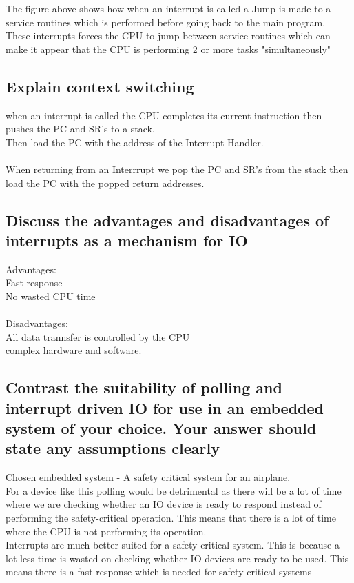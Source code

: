 \documentclass{article}
\begin{document}
The figure above shows how when an interrupt is called a Jump is made to a service routines which is performed before going back to the main program.\\
These interrupts forces the CPU to jump between service routines which can make it appear that the CPU is performing 2 or more tasks "simultaneously"

\subsection{Explain context switching}

when an interrupt is called the CPU completes its current instruction then pushes the PC and SR's to a stack.\\
Then load the PC with the address of the Interrupt Handler.\\\\
When returning from an Interrrupt we pop the PC and SR's from the stack then load the PC with the popped return addresses.

\subsection{Discuss the advantages and disadvantages of interrupts as a mechanism for IO}
Advantages:\\
Fast response\\
No wasted CPU time\\\\
Disadvantages:\\
All data trannsfer is controlled by the CPU\\
complex hardware and software.

\subsection{Contrast the suitability of polling and interrupt driven IO for use in an embedded system of your choice. Your answer should state any assumptions clearly}
Chosen embedded system - A safety critical system for an airplane.\\
For a device like this polling would be detrimental as there will be a lot of time where we are checking whether an IO device is ready to respond instead of performing the safety-critical operation. This means that there is a lot of time where the CPU is not performing its operation.\\
Interrupts are much better suited for a safety critical system. This is because a lot less time is wasted on checking whether IO devices are ready to be used. This means there is a fast response which is needed for safety-critical systems
\end{document}
